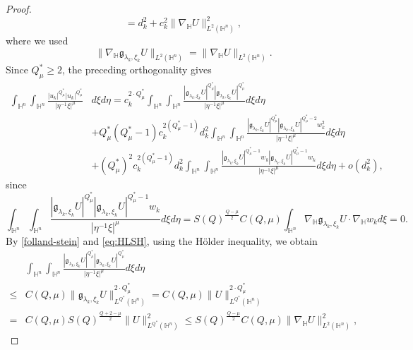 \documentclass[10pt,a4paper]{amsart}
\begin{document}
\begin{proof}
\begin{equation*}
 =d_k^2+c_k^2\|\nabla_\mathbb{H}U\|^2_{L^{2}(\mathbb{H}^n)},
 \end{equation*}
 where we used
 \begin{equation*}
 \|\nabla_\mathbb{H}\mathfrak{g}_{\lambda_k,\xi_k}U\|_{L^{2}(\mathbb{H}^n)}=\|\nabla_\mathbb{H}U\|
 _{L^{2}(\mathbb{H}^n)}.
 \end{equation*}
 {Since $Q^{\ast}_{\mu}\geq2$, the preceding orthogonality gives}
 \begin{align}\label{local3}
 \int_{\mathbb{H}^{n}}\int_{\mathbb{H}^{n}}\frac{|u_k|^{Q^{\ast}_{\mu}}|u_k|
^{Q^{\ast}_{\mu}}}{|\eta^{-1}\xi|^{\mu}}&{d}\xi{d}\eta
 = c_k^{2\cdot Q_{\mu}^{\ast}} \int_{\mathbb{H}^{n}}\int_{\mathbb{H}^{n}}\frac{|\mathfrak{g}_{\lambda_k,\xi_k}U|^{Q^{\ast}_{\mu}}|\mathfrak{g}_{\lambda_k,\xi_k}U|
^{Q^{\ast}_{\mu}}}{|\eta^{-1}\xi|^{\mu}}{d}\xi{d}\eta
\nonumber \\& + Q_{\mu}^{\ast}(Q_{\mu}^{\ast}-1)c_k^{2(Q_{\mu}^{\ast}-1)}d_k^2 {\int_{\mathbb{H}^{n}}\int_{\mathbb{H}^{n}}\frac{|\mathfrak{g}_{\lambda_k,\xi_k}U|^{Q^{\ast}_{\mu}}|\mathfrak{g}_{\lambda_k,\xi_k}U|
^{Q^{\ast}_{\mu}-2} w_k^2}{|\eta^{-1}\xi|^{\mu}}{d}\xi{d}\eta} \nonumber\\
 & + (Q_{\mu}^{\ast})^2c_k^{2(Q_{\mu}^{\ast}-1)}d_k^2 \int_{\mathbb{H}^{n}}\int_{\mathbb{H}^{n}}\frac{|\mathfrak{g}_{\lambda_k,\xi_k}U|^{Q^{\ast}_{\mu}-1}w_k|\mathfrak{g}_{\lambda_k,\xi_k}U|
^{Q^{\ast}_{\mu}-1}w_k}{|\eta^{-1}\xi|^{\mu}}{d}\xi{d}\eta+ o(d_k^2),
 \end{align}
 since
 \begin{equation*}
 \int_{\mathbb{H}^{n}}\int_{\mathbb{H}^{n}}\frac{|\mathfrak{g}_{\lambda_k,\xi_k}U|^{Q^{\ast}_{\mu}}|\mathfrak{g}_{\lambda_k,\xi_k}U|
^{Q^{\ast}_{\mu}-1}w_k}{|\eta^{-1}\xi|^{\mu}}{d}\xi{d}\eta=S(Q)^{\frac{Q-\mu}{2}}C(Q,\mu)\int_{\mathbb{H}^{n}} \nabla_\mathbb{H}\mathfrak{g}_{\lambda_k,\xi_k}U\cdot \nabla_\mathbb{H}w_k d\xi=0.
 \end{equation*}
By \eqref{folland-stein} and \eqref{eq:HLSH}, using the
 H\"{o}lder inequality, we obtain
 \begin{align*}
 &\int_{\mathbb{H}^{n}}\int_{\mathbb{H}^{n}}\frac{|\mathfrak{g}_{\lambda_k,\xi_k}U|^{Q^{\ast}_{\mu}}|\mathfrak{g}_{\lambda_k,\xi_k}U|
^{Q^{\ast}_{\mu}}}{|\eta^{-1}\xi|^{\mu}}{d}\xi{d}\eta \\ \leq & C(Q,\mu)\|\mathfrak{g}_{\lambda_k,\xi_k}U\|_{L^{Q^{\ast}}(\mathbb{H}^{n})}^{2\cdot Q^{\ast}_{\mu}}=
C(Q,\mu)\|U\|_{L^{Q^{\ast}}(\mathbb{H}^{n})}^{2\cdot Q^{\ast}_{\mu}}\\
=&C(Q,\mu)S(Q)^{\frac{Q+2-\mu}{2}}\|U\|_{L^{Q^{\ast}}(\mathbb{H}^{n})}^{2}\leq S(Q)^{\frac{Q-\mu}{2}}C(Q,\mu)\|\nabla_\mathbb{H}U\|^2_{L^{2}(\mathbb{H}^{n})},

\end{align*}
\end{proof}
\end{document}

